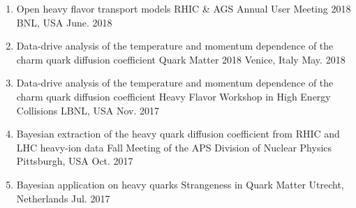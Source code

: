 

\begin{cventries}

\begin{enumerate}[wide, labelwidth=!, labelindent=0pt]
\item 
  \cvsubsubentry
    { Open heavy flavor transport models} %
    {RHIC \& AGS Annual User Meeting 2018} %
    {BNL, USA} %
    {June. 2018} %

\item 
  \cvsubsubentry
    { Data-drive analysis of the temperature and momentum dependence of the charm quark diffusion coefficient} %
    {Quark Matter 2018} %
    {Venice, Italy} %
    {May. 2018} %

\item 
  \cvsubsubentry
    { Data-drive analysis of the temperature and momentum dependence of the charm quark diffusion coefficient} %
    {Heavy Flavor Workshop in High Energy Collisions} %
    {LBNL, USA} %
    {Nov. 2017} %

\item 
  \cvsubsubentry
    { Bayesian extraction of the heavy quark diffusion coefficient from RHIC and LHC heavy-ion data} %
    {Fall Meeting of the APS Division of Nuclear Physics} %
    {Pittsburgh, USA} %
    {Oct. 2017} %

\item 
  \cvsubsubentry
    { Bayesian application on heavy quarks} %
    {Strangeness in Quark Matter} %
    {Utrecht, Netherlands} %
    {Jul. 2017} %





\end{enumerate}
\end{cventries}
